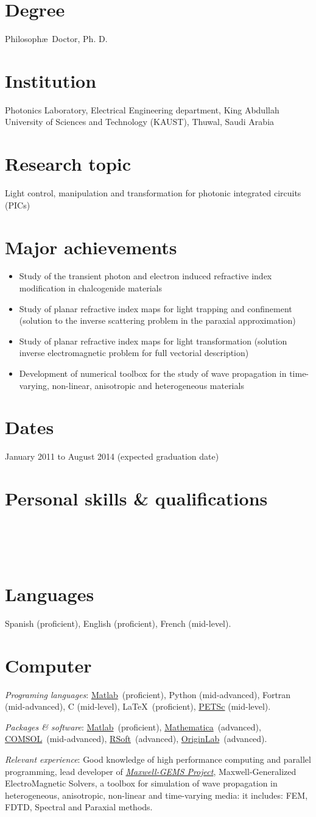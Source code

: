 \documentclass[margin,10pt]{res}
\newcommand{\R}{\textsuperscript{\textregistered}}
\newcommand{\subs}[1]{\normalfont #1}
\newcommand{\httpmg}{http://github.com/damiansra/maxwell-gems}
\newcommand{\secs}[1]{\normalsize{\section{\subs{#1}}}}
\newcommand{\KAUST}{King Abdullah University of Sciences and Technology (KAUST)}
\begin{document}
\secs{Degree}
Philosoph\ae~Doctor, Ph. D.
\secs{Institution} 
Photonics Laboratory, Electrical Engineering department, \KAUST, Thuwal, Saudi Arabia
\secs{Research topic} 
Light control, manipulation and transformation for photonic integrated circuits (PICs)
\secs{Major achievements}
\begin{itemize}
	\item Study of the transient photon and electron induced refractive index modification in chalcogenide materials
	\item Study of planar refractive index maps for light trapping and confinement (solution to the inverse scattering problem in the paraxial approximation)
	\item Study of planar refractive index maps for light transformation (solution inverse electromagnetic problem for full vectorial description)
	\item Development of numerical toolbox for the study of wave propagation in time-varying, non-linear, anisotropic and heterogeneous materials  
\end{itemize} 

\secs{Dates} January 2011 to August 2014 (expected graduation date) \\


\section{Personal skills \& qualifications}

\secs{~~}
\secs{Languages}
Spanish (proficient), English (proficient), French (mid-level).

\secs{Computer}
\emph{Programing languages}: \href{http://www.matlab.com}{Matlab\R}~(proficient), Python (mid-advanced), Fortran (mid-advanced), C (mid-level), \LaTeX~(proficient), \href{http://www.mcs.anl.gov/petsc/}{PETSc} (mid-level).

\emph{Packages \& software}: \href{http://www.matlab.com}{Matlab\R}~(proficient), \href{http://www.wolfram.com/mathematica/}{Mathematica\R}~(advanced), \href{http://www.comsol.com}{COMSOL\R}~(mid-advanced), \href{http://www.rsoftdesign.com/}{RSoft\R}~(advanced), \href{http://www.originlab.com}{OriginLab\R}~(advanced).

\emph{Relevant experience}: Good knowledge of high performance computing and parallel programming, lead developer of \href{\httpmg}{\emph{Maxwell-GEMS Project}}, Maxwell-Generalized ElectroMagnetic Solvers, a toolbox for simulation of wave propagation  in heterogeneous, anisotropic, non-linear and time-varying media: it includes: FEM, FDTD, Spectral and Paraxial methods.
\end{document}
